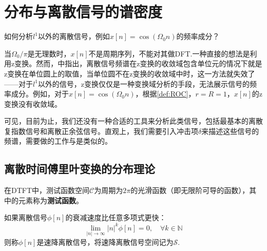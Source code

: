 \section{分布与离散信号的谱密度}\label{sec:Discrete_Distribution}

如何分析$l^1$以外的离散信号，例如$x[n]=\cos(\Omega_0 n)$的频率成分？

当$\Omega_0/\pi$是无理数时，$x[n]$不是周期序列，不能对其做DFT.一种直接的想法是利用z变换。然而，中指出，离散信号频谱在z变换的收敛域包含单位元的情况下就是z变换在单位圆上的取值，当单位圆不在z变换的收敛域中时，这一方法就失效了——对于$l^1$以外的信号，z变换仅仅是一种变换域分析的手段，无法展示信号的频率成分。例如，对于$x[n]=\cos(\Omega_0 n)$，根据\cref{def:ROC}，$r=R=1$，$x[n]$的z变换没有收敛域。

可见，目前为止，我们还没有一种合适的工具来分析此类信号，包括最基本的离散复指数信号和离散正余弦信号。直观上，我们需要引入冲击项$\delta$来描述这些信号的频谱，需要做的工作与是类似的。

\subsection{离散时间傅里叶变换的分布理论}\label{sub:DTFT_distribution}

\begin{definition}[测试函数]
    在DTFT中，测试函数空间$\mathcal{C}$为周期为$2\pi$的光滑函数（即无限阶可导的函数），其中的元素称为\textbf{测试函数}。
\end{definition}

\begin{definition}[速降离散信号]
    如果离散信号$\phi[n]$的衰减速度比任意多项式更快：
    $$\lim_{|n|\to\infty}|n|^k\phi[n]=0,\quad \forall k\in\mathbb{N}$$
    则称$\phi[n]$是速降离散信号，将速降离散信号空间记为$\mathcal{S}$.
\end{definition}

